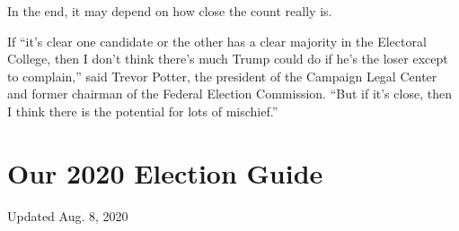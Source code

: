 In the end, it may depend on how close the count really is.

If ``it's clear one candidate or the other has a clear majority in the
Electoral College, then I don't think there's much Trump could do if
he's the loser except to complain,'' said Trevor Potter, the president
of the Campaign Legal Center and former chairman of the Federal Election
Commission. ``But if it's close, then I think there is the potential for
lots of mischief.''

\hypertarget{our-2020-election-guide}{%
\section{Our 2020 Election Guide}\label{our-2020-election-guide}}

Updated Aug. 8, 2020


